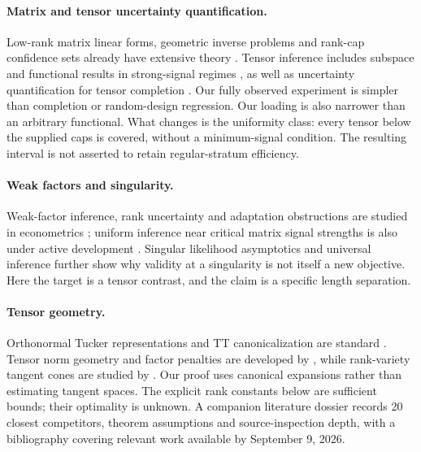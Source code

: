 \documentclass[11pt]{article}
\theoremstyle{remark}
\begin{document}
\paragraph{Matrix and tensor uncertainty quantification.}
Low-rank matrix linear forms, geometric inverse problems and rank-cap confidence sets already have extensive theory \citep{xiayuan2021,cailiangrakhlin2016,carpentierkim2018,carpentieretal2018}. Tensor inference includes subspace and functional results in strong-signal regimes \citep{xiazhangzhou2022,agterberg2024}, as well as uncertainty quantification for tensor completion \citep{caipoorchen2023}. Our fully observed experiment is simpler than completion or random-design regression. Our loading is also narrower than an arbitrary functional. What changes is the uniformity class: every tensor below the supplied caps is covered, without a minimum-signal condition. The resulting interval is not asserted to retain regular-stratum efficiency.

\paragraph{Weak factors and singularity.}
Weak-factor inference, rank uncertainty and adaptation obstructions are studied in econometrics \citep{zhu2019,armstrong2026,choi2026}; uniform inference near critical matrix signal strengths is also under active development \citep{bykhovskaya2025}. Singular likelihood asymptotics \citep{drton2009} and universal inference \citep{wasserman2020} further show why validity at a singularity is not itself a new objective. Here the target is a tensor contrast, and the claim is a specific length separation.

\paragraph{Tensor geometry.}
Orthonormal Tucker representations and TT canonicalization are standard \citep{delathauwer2000,oseledets2011}. Tensor norm geometry and factor penalties are developed by \citet{friedlandlim2018,fan2023}, while rank-variety tangent cones are studied by \citet{gao2025,kutschan2018}. Our proof uses canonical expansions rather than estimating tangent spaces. The explicit rank constants below are sufficient bounds; their optimality is unknown. A companion literature dossier records 20 closest competitors, theorem assumptions and source-inspection depth, with a bibliography covering relevant work available by September 9, 2026.
\end{document}
